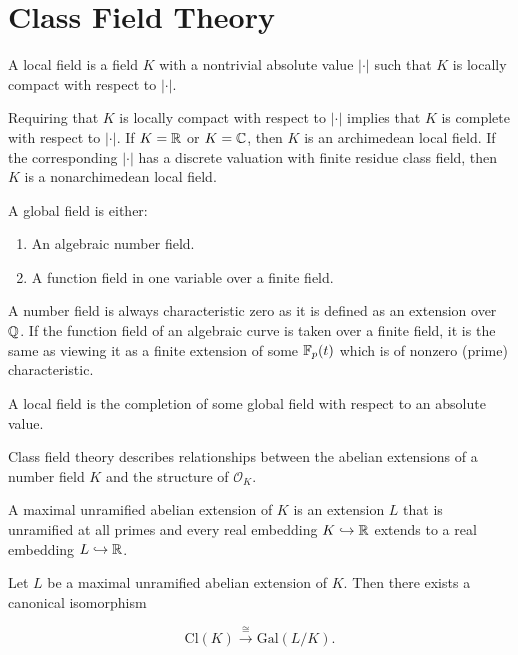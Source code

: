 \setchapterpreamble[u]{\margintoc}
\chapter{Class Field Theory}


\begin{definition}
    A local field is a field $K$ with a nontrivial absolute value $|\cdot|$ such that $K$ is locally compact with respect to $|\cdot|$.
\end{definition}

Requiring that $K$ is locally compact with respect to $|\cdot|$ implies that $K$ is complete with respect to $|\cdot|$. If $K = \mathbb{R}$ or $K = \mathbb{C}$, then $K$ is an archimedean local field. If the corresponding $|\cdot|$ has a discrete valuation with finite residue class field, then $K$ is a nonarchimedean local field.

\begin{definition}
    A global field is either:

    \begin{enumerate}[(1)]
        \item An algebraic number field.
        \item A function field in one variable over a finite field.
    \end{enumerate}
\end{definition}

A number field is always characteristic zero as it is defined as an extension over $\mathbb{Q}$. If the function field of an algebraic curve is taken over a finite field, it is the same as viewing it as a finite extension of some $\mathbb{F}_p(t)$ which is of nonzero (prime) characteristic.

\begin{proposition}
    A local field is the completion of some global field with respect to an absolute value.
\end{proposition}

Class field theory describes relationships between the abelian extensions of a number field $K$ and the structure of $\mathcal{O}_{K}$.

\begin{definition}
    A maximal unramified abelian extension of $K$ is an extension $L$ that is unramified at all primes and every real embedding $K \hookrightarrow \mathbb{R}$ extends to a real embedding $L \hookrightarrow \mathbb{R}$.
\end{definition}


\begin{theorem}
    Let $L$ be a maximal unramified abelian extension of $K$. Then there exists a canonical isomorphism

    \[\textrm{Cl}(K)\xrightarrow{\cong} \textrm{Gal}(L/K).\]

\end{theorem}